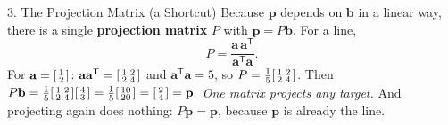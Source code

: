 \documentclass[10pt]{article}
\newcommand{\bb}{\mathbf{b}}
\newcommand{\pp}{\mathbf{p}}
\newcommand{\avec}{\mathbf{a}}
\newcommand{\T}{\mathsf{T}}
\begin{document}
\begin{notesbox}{3. The Projection Matrix (a Shortcut)}
Because $\pp$ depends on $\bb$ in a linear way, there is a single \textbf{projection matrix} $P$ with
$\pp=P\bb$. For a line,
\[
  P=\frac{\avec\,\avec^{\T}}{\avec^{\T}\avec}.
\]
For $\avec=\begin{bsmallmatrix} 1\\2 \end{bsmallmatrix}$: $\avec\avec^{\T}=\begin{bsmallmatrix} 1 & 2\\ 2 & 4 \end{bsmallmatrix}$ and $\avec^{\T}\avec=5$, so
$P=\frac{1}{5}\begin{bsmallmatrix} 1 & 2\\ 2 & 4 \end{bsmallmatrix}$. Then
$P\bb=\frac{1}{5}\begin{bsmallmatrix} 1 & 2\\ 2 & 4 \end{bsmallmatrix}\begin{bsmallmatrix} 4\\3 \end{bsmallmatrix}=\frac{1}{5}\begin{bsmallmatrix} 10\\20 \end{bsmallmatrix}=\begin{bsmallmatrix} 2\\4 \end{bsmallmatrix}=\pp.$
\emph{One matrix projects any target.} And projecting again does nothing: $P\pp=\pp$, because $\pp$ is
already  the line.
\end{notesbox}
\end{document}
